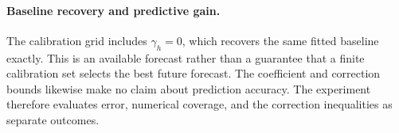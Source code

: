 \paragraph{Baseline recovery and predictive gain.}
The calibration grid includes $\gamma_h=0$, which recovers the same
fitted baseline exactly. This is an available forecast rather than a
guarantee that a finite calibration set selects the best future forecast.
The coefficient and correction bounds likewise make no claim about
prediction accuracy. The experiment therefore evaluates error, numerical
coverage, and the correction inequalities as separate outcomes.
